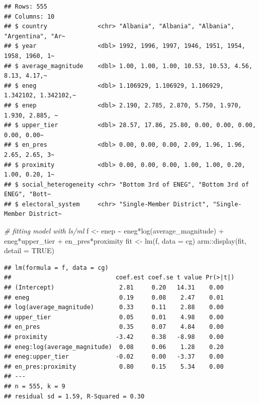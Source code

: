 \documentclass[
]{book}
\newenvironment{Shaded}{\begin{snugshade}}{\end{snugshade}}
\newcommand{\AttributeTok}[1]{\textcolor[rgb]{0.77,0.63,0.00}{#1}}
\newcommand{\CommentTok}[1]{\textcolor[rgb]{0.56,0.35,0.01}{\textit{#1}}}
\newcommand{\ConstantTok}[1]{\textcolor[rgb]{0.00,0.00,0.00}{#1}}
\newcommand{\FunctionTok}[1]{\textcolor[rgb]{0.00,0.00,0.00}{#1}}
\newcommand{\NormalTok}[1]{#1}
\newcommand{\OtherTok}[1]{\textcolor[rgb]{0.56,0.35,0.01}{#1}}
\newcommand{\SpecialCharTok}[1]{\textcolor[rgb]{0.00,0.00,0.00}{#1}}
\begin{document}
\begin{verbatim}
## Rows: 555
## Columns: 10
## $ country              <chr> "Albania", "Albania", "Albania", "Argentina", "Ar~
## $ year                 <dbl> 1992, 1996, 1997, 1946, 1951, 1954, 1958, 1960, 1~
## $ average_magnitude    <dbl> 1.00, 1.00, 1.00, 10.53, 10.53, 4.56, 8.13, 4.17,~
## $ eneg                 <dbl> 1.106929, 1.106929, 1.106929, 1.342102, 1.342102,~
## $ enep                 <dbl> 2.190, 2.785, 2.870, 5.750, 1.970, 1.930, 2.885, ~
## $ upper_tier           <dbl> 28.57, 17.86, 25.80, 0.00, 0.00, 0.00, 0.00, 0.00~
## $ en_pres              <dbl> 0.00, 0.00, 0.00, 2.09, 1.96, 1.96, 2.65, 2.65, 3~
## $ proximity            <dbl> 0.00, 0.00, 0.00, 1.00, 1.00, 0.20, 1.00, 0.20, 1~
## $ social_heterogeneity <chr> "Bottom 3rd of ENEG", "Bottom 3rd of ENEG", "Bott~
## $ electoral_system     <chr> "Single-Member District", "Single-Member District~
\end{verbatim}

\begin{Shaded}
\begin{Highlighting}[]
\CommentTok{\# fitting model with ls/ml}
\NormalTok{f }\OtherTok{\textless{}{-}}\NormalTok{ enep }\SpecialCharTok{\textasciitilde{}}\NormalTok{ eneg}\SpecialCharTok{*}\FunctionTok{log}\NormalTok{(average\_magnitude) }\SpecialCharTok{+}\NormalTok{ eneg}\SpecialCharTok{*}\NormalTok{upper\_tier }\SpecialCharTok{+}\NormalTok{ en\_pres}\SpecialCharTok{*}\NormalTok{proximity}
\NormalTok{fit }\OtherTok{\textless{}{-}} \FunctionTok{lm}\NormalTok{(f, }\AttributeTok{data =}\NormalTok{ cg)}
\NormalTok{arm}\SpecialCharTok{::}\FunctionTok{display}\NormalTok{(fit, }\AttributeTok{detail =} \ConstantTok{TRUE}\NormalTok{)}
\end{Highlighting}
\end{Shaded}

\begin{verbatim}
## lm(formula = f, data = cg)
##                             coef.est coef.se t value Pr(>|t|)
## (Intercept)                  2.81     0.20   14.31    0.00   
## eneg                         0.19     0.08    2.47    0.01   
## log(average_magnitude)       0.33     0.11    2.88    0.00   
## upper_tier                   0.05     0.01    4.98    0.00   
## en_pres                      0.35     0.07    4.84    0.00   
## proximity                   -3.42     0.38   -8.98    0.00   
## eneg:log(average_magnitude)  0.08     0.06    1.28    0.20   
## eneg:upper_tier             -0.02     0.00   -3.37    0.00   
## en_pres:proximity            0.80     0.15    5.34    0.00   
## ---
## n = 555, k = 9
## residual sd = 1.59, R-Squared = 0.30
\end{verbatim}
\end{document}
